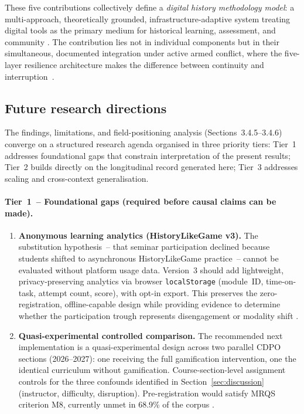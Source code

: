 These five contributions collectively define a \emph{digital history methodology model}: a multi-approach, theoretically grounded, infrastructure-adaptive system treating digital tools as the primary medium for historical learning, assessment, and community \cite{Ertmer1999, Humeniuk2022113, Nunez202329}. The contribution lies not in individual components but in their simultaneous, documented integration under active armed conflict, where the five-layer resilience architecture makes the difference between continuity and interruption~\cite{Korniienko2025aredu}.

\subsection{Future research directions}

\label{sec:future-research}

The findings, limitations, and field-positioning analysis (Sections~3.4.5--3.4.6)
converge on a structured research agenda organised in three priority tiers:
Tier~1 addresses foundational gaps that constrain interpretation of the present results;
Tier~2 builds directly on the longitudinal record generated here;
Tier~3 addresses scaling and cross-context generalisation.

\paragraph{Tier~1~-- Foundational gaps (required before causal claims can be made).}

\begin{enumerate}

\item \textbf{Anonymous learning analytics (HistoryLikeGame v3).}
The substitution hypothesis~-- that seminar participation declined because students shifted to asynchronous HistoryLikeGame practice~-- cannot be evaluated without platform usage data. Version~3 should add lightweight, privacy-preserving analytics via browser \texttt{localStorage} (module~ID, time-on-task, attempt count, score), with opt-in export. This preserves the zero-registration, offline-capable design while providing evidence to determine whether the participation trough represents disengagement or modality shift \cite{KoivistoHamari2019, Sailer2017}.

\item \textbf{Quasi-experimental controlled comparison.}
The recommended next implementation is a quasi-experimental design across two parallel CDPO sections (2026--2027): one receiving the full gamification intervention, one the identical curriculum without gamification. Course-section-level assignment controls for the three confounds identified in Section~\ref{sec:discussion} (instructor, difficulty, disruption). Pre-registration would satisfy MRQS criterion M8, currently unmet in 68.9\% of the corpus \cite{KorniienkoSemerikov2024, Schulz2010CONSORT, creswell}.

\end{enumerate}

